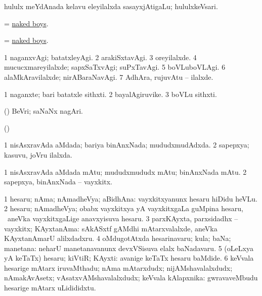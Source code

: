 \bentry
{}
\gl{\nA}
\bmng
hululx meYdAnada kelavu eleyilalxda sasayxjAtigaLu; hululxkeVsari. 
\emng
\eentry

\bentry
{}
\gl{\nA}
\bmng
= \hyperlink{naked boys}{naked boys}.
\emng
\eentry

\bentry
{}
\gl{\nA}
\bmng
= \hyperlink{naked boys}{naked boys}.
\emng
\eentry

\bentry
{}
\gl{\kirxvi}
\bmng
\bnum
\num{1} naganxvAgi; batatxleyAgi. 
\num{2} arakiSxtavAgi. 
\num{3} oreyilalxde. 
\num{4} mucucxmareyilalxde; sapxSaTxvAgi; suPxTavAgi. 
\num{5} boVLuboVLAgi. 
\num{6} alaMkAravilalxde; nirABaraNavAgi. 
\num{7} AdhAra, rujuvAtu -- ilalxde. 
\enum
\emng
\eentry

\bentry
{}
\gl{\nA}
\bmng
\bnum
\num{1} naganxte; bari batatxle sithxti. 
\num{2} bayalAgiruvike. 
\num{3} boVLu sithxti. 
\enum
\emng
\eentry

\bentry
{}
\gl{\nA}
\bmng
(\ca) BeVri; saNaNx nagAri. 
\emng
\eentry

\bentry
{}
\gl{\saMkiSx}
\bmng
(\birx)  
\emng
\eentry

\bentry
{}
\gl{\gu}
\bmng
\bnum
\num{1} nisAsxravAda aMdada; bariya binAnxNada; mududxmudAdxda. 
\num{2} sapepxya; kasuvu, joVru ilalxda. 
\enum
\emng
\eentry

\bentry
{}
\gl{\nA}
\bmng
\bnum
\num{1} nisAsxravAda aMdada mAtu; mududxmududx mAtu; binAnxNada mAtu. 
\num{2} sapepxya, binAnxNada -- vayxkitx. 
\enum
\emng
\eentry

\bentry
{}
\gl{\nA}
\bmng
\bnum
\num{1} hesaru; nAma; nAmadheVya; aBidhAna:  vayxkitxyanunx hesaru hiDidu heVLu. 
\num{2} hesaru; nAmadheVya; obabx vayxkitxya yA vayxkitxgaLa guMpina hesaru, \kanmu\ aneVka vayxkitxgaLige anavxyisuva hesaru. 
\num{3} parxKAyxta, parxsidadhx -- vayxkitx; KAyxtanAma:  sAkASxtf gAMdhi mAtarxvalalxde, aneVka KAyxtanAmarU alilxdadxru. 
\num{4} oMdugotAtxda hesarinavaru; kula; baNa; manetana:  neharU manetanavanunx devxVSisuva elalx baNadavaru. 
\num{5} (oLeLxya yA keTaTx) hesaru; kiVtiR; KAyxti:  avanige keTaTx hesaru baMdide. 
\num{6} keVvala hesarige mAtarx iruvaMthadu; nAma mAtarxdudx; nijAMshavalalxdudx; nAmakAvAsetx; vAsatxvAMshavalalxdudx; keVvala kAlapxnika:  gwravaveMbudu hesarige mAtarx uLidididxtu. 
\enum
\emng

